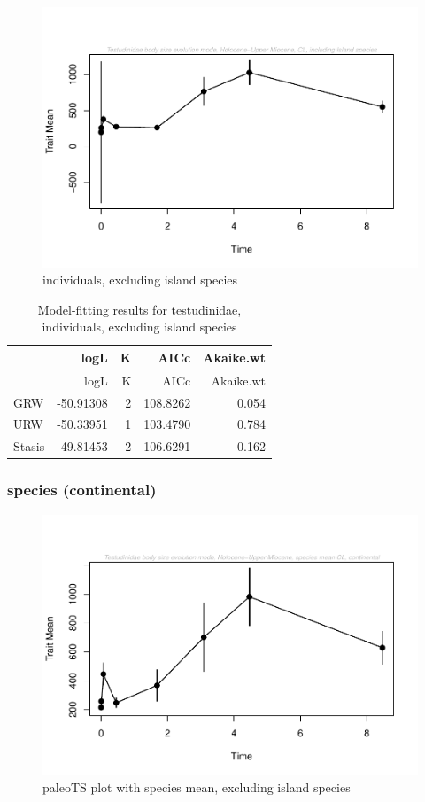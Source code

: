 \documentclass[]{article}
\begin{document}
\begin{figure}[htbp]
\centering
\includegraphics{MA_JJ_files/figure-latex/paleoTS, individuals, exluding island species-1.pdf}
\caption{individuals, excluding island species}
\end{figure}

\begin{longtable}[]{@{}lrrrr@{}}
\caption{Model-fitting results for testudinidae, individuals, excluding
island species}\tabularnewline
\toprule
& logL & K & AICc & Akaike.wt\tabularnewline
\midrule
\endfirsthead
\toprule
& logL & K & AICc & Akaike.wt\tabularnewline
\midrule
\endhead
GRW & -50.91308 & 2 & 108.8262 & 0.054\tabularnewline
URW & -50.33951 & 1 & 103.4790 & 0.784\tabularnewline
Stasis & -49.81453 & 2 & 106.6291 & 0.162\tabularnewline
\bottomrule
\end{longtable}

\newpage

\subsubsection{species (continental)}\label{species-continental}

\begin{figure}[htbp]
\centering
\includegraphics{MA_JJ_files/figure-latex/paleoTS plot with species mean, excluding island species-1.pdf}
\caption{paleoTS plot with species mean, excluding island species}
\end{figure}
\end{document}
